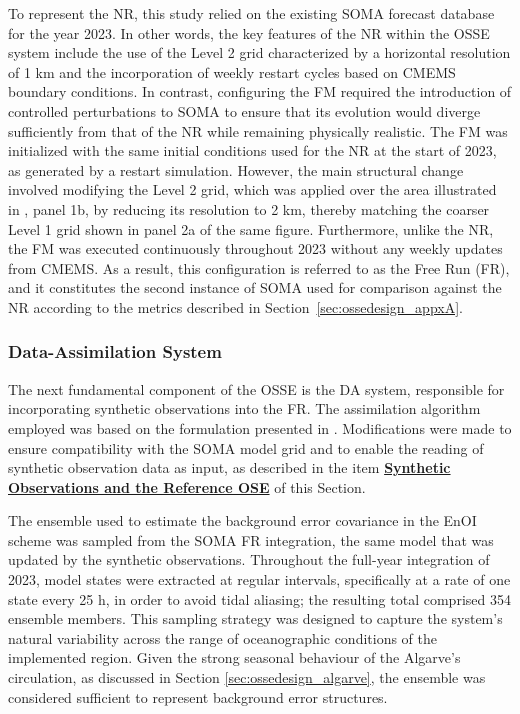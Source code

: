 To represent the NR, this study relied on the existing SOMA forecast database for the year 2023. In other words, the key features of the NR within the OSSE system include the use of the Level 2 grid characterized by a horizontal resolution of 1 km and the incorporation of weekly restart cycles based on CMEMS boundary conditions. In contrast, configuring the FM required the introduction of controlled perturbations to SOMA to ensure that its evolution would diverge sufficiently from that of the NR while remaining physically realistic. The FM was initialized with the same initial conditions used for the NR at the start of 2023, as generated by a restart simulation. However, the main structural change involved modifying the Level 2 grid, which was applied over the area illustrated in , panel 1b, by reducing its resolution to 2 km, thereby matching the coarser Level 1 grid shown in panel 2a of the same figure. Furthermore, unlike the NR, the FM was executed continuously throughout 2023 without any weekly updates from CMEMS. As a result, this configuration is referred to as the Free Run (FR), and it constitutes the second instance of SOMA used for comparison against the NR according to the metrics described in Section~\ref{sec:ossedesign_appxA}.

\subsubsection{Data-Assimilation System}
The next fundamental component of the OSSE is the DA system, responsible for incorporating synthetic observations into the FR. The assimilation algorithm employed was based on the formulation presented in \textcite{counillon2023framework}. Modifications were made to ensure compatibility with the SOMA model grid and to enable the reading of synthetic observation data as input, as described in the item \hyperlink{subsec:ossedesign_synthetic}{\textbf{Synthetic Observations and the Reference OSE}} of this Section.

The ensemble used to estimate the background error covariance in the EnOI scheme was sampled from the SOMA FR integration, the same model that was updated by the synthetic observations. Throughout the full-year integration of 2023, model states were extracted at regular intervals, specifically at a rate of one state every 25 h, in order to avoid tidal aliasing; the resulting total comprised 354 ensemble members. This sampling strategy was designed to capture the system's natural variability across the range of oceanographic conditions of the implemented region. Given the strong seasonal behaviour of the Algarve's circulation, as discussed in Section \ref{sec:ossedesign_algarve}, the ensemble was considered sufficient to represent background error structures.

